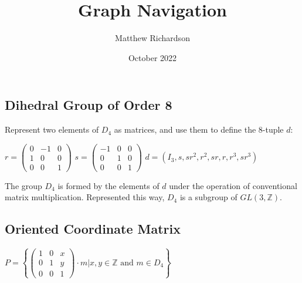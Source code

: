 \documentclass[12pt]{article}
\title{Graph Navigation}
\author{Matthew Richardson}
\date{October 2022}
\begin{document}
\subsection*{Dihedral Group of Order 8}
Represent two elements of $D_4$ as matrices, and use them to define the 8-tuple $d$:
\begin{center}
    $r=\begin{pmatrix} 0 & -1 & 0 \\ 1 & 0 & 0 \\ 0 & 0 & 1 \end{pmatrix}$
    \quad
    $s=\begin{pmatrix} -1 & 0 & 0 \\ 0 & 1 & 0 \\ 0 & 0 & 1 \end{pmatrix}$
    \quad\quad
    $d=(I_3,s,sr^2,r^2,sr,r,r^3,sr^3)$
\end{center}
The group $D_4$ is formed by the elements of $d$ under the operation of conventional matrix multiplication. Represented this way, $D_4$ is a subgroup of $GL(3,\mathbb{Z})$.
\subsection*{Oriented Coordinate Matrix}
\begin{center}
    $P=\left\{\begin{pmatrix}
        1 & 0 & x \\
        0 & 1 & y \\
        0 & 0 & 1 \end{pmatrix}\cdot m\mathrel{\bigg|} x,y\in\mathbb{Z}\text{ and }m\in D_4\right\}$
\end{center}
\end{document}
